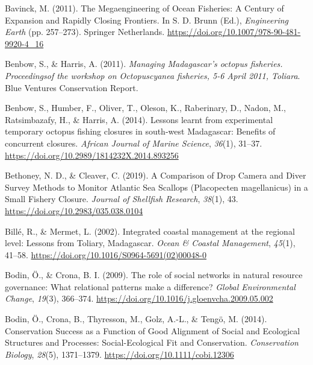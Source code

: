 \documentclass[
]{article}
\newlength{\cslhangindent}
\newlength{\cslentryspacingunit} %
\newenvironment{CSLReferences}[2] %
 {%
  \setlength{\parindent}{0pt}
  \ifodd #1
  \let\oldpar\par
  \def\par{\hangindent=\cslhangindent\oldpar}
  \fi
  \setlength{\parskip}{#2\cslentryspacingunit}
 }%
 {}
\begin{document}
\begin{CSLReferences}{1}{2}
\leavevmode{}%
Bavinck, M. (2011). The {Megaengineering} of {Ocean} {Fisheries}: {A} {Century} of {Expansion} and {Rapidly} {Closing} {Frontiers}. In S. D. Brunn (Ed.), \emph{Engineering {Earth}} (pp. 257--273). Springer Netherlands. \url{https://doi.org/10.1007/978-90-481-9920-4_16}

\leavevmode{}%
Benbow, S., \& Harris, A. (2011). \emph{Managing {Madagascar}'s octopus fisheries. {Proceedingsof} the workshop on {Octopuscyanea} fisheries, 5-6 {April} 2011, {Toliara}}. Blue Ventures Conservation Report.

\leavevmode{}%
Benbow, S., Humber, F., Oliver, T., Oleson, K., Raberinary, D., Nadon, M., Ratsimbazafy, H., \& Harris, A. (2014). Lessons learnt from experimental temporary octopus fishing closures in south-west {Madagascar}: Benefits of concurrent closures. \emph{African Journal of Marine Science}, \emph{36}(1), 31--37. \url{https://doi.org/10.2989/1814232X.2014.893256}

\leavevmode{}%
Bethoney, N. D., \& Cleaver, C. (2019). A {Comparison} of {Drop} {Camera} and {Diver} {Survey} {Methods} to {Monitor} {Atlantic} {Sea} {Scallops} ({Placopecten} magellanicus) in a {Small} {Fishery} {Closure}. \emph{Journal of Shellfish Research}, \emph{38}(1), 43. \url{https://doi.org/10.2983/035.038.0104}

\leavevmode{}%
Billé, R., \& Mermet, L. (2002). Integrated coastal management at the regional level: Lessons from {Toliary}, {Madagascar}. \emph{Ocean \& Coastal Management}, \emph{45}(1), 41--58. \url{https://doi.org/10.1016/S0964-5691(02)00048-0}

\leavevmode{}%
Bodin, Ö., \& Crona, B. I. (2009). The role of social networks in natural resource governance: {What} relational patterns make a difference? \emph{Global Environmental Change}, \emph{19}(3), 366--374. \url{https://doi.org/10.1016/j.gloenvcha.2009.05.002}

\leavevmode{}%
Bodin, Ö., Crona, B., Thyresson, M., Golz, A.-L., \& Tengö, M. (2014). Conservation {Success} as a {Function} of {Good} {Alignment} of {Social} and {Ecological} {Structures} and {Processes}: {Social}-{Ecological} {Fit} and {Conservation}. \emph{Conservation Biology}, \emph{28}(5), 1371--1379. \url{https://doi.org/10.1111/cobi.12306}


\end{CSLReferences}
\end{document}
